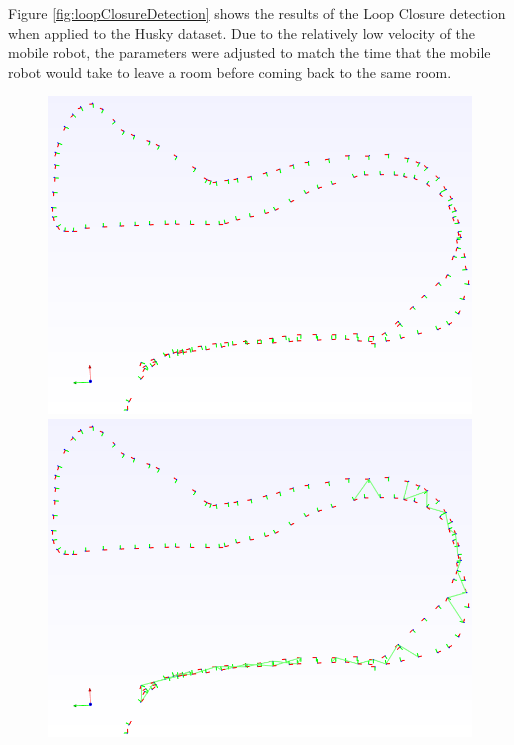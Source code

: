 \documentclass[11pt]{article}
\begin{document}
Figure \ref{fig:loopClosureDetection} shows the results of the Loop Closure detection when applied to the Husky dataset. Due to the relatively low velocity of the mobile robot, the parameters were adjusted to match the time that the mobile robot would take to leave a room before coming back to the same room.

\begin{figure}
\begin{minipage}{0.67\textwidth}
\centering
\includegraphics[width=\textwidth]{LoopClosureTimeSampling}
\includegraphics[width=\textwidth]{LoopClosureEuclideanSampling}

\end{minipage}
\end{figure}
\end{document}
